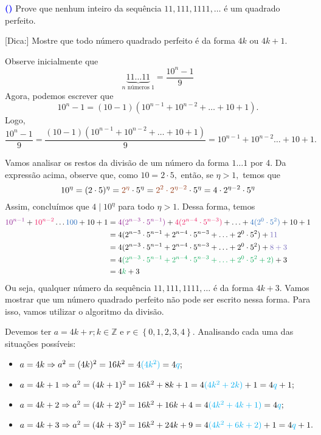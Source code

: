 \documentclass[12pt, a4paper]{article}
\newcommand{\Z}{\mathbb{Z}}
\newcounter{exercicio}[section]
\newenvironment{exercicio}[1][]{\refstepcounter{exercicio}\par\medskip
 \textcolor{blue}{\bf(\theexercicio)} \rmfamily}{\medskip }
\begin{document}
\begin{exercicio}
 Prove que nenhum inteiro da sequência $11, 111, 1111, \ldots$ é um quadrado perfeito.
 
 \textsf{[Dica:] Mostre que todo número quadrado perfeito é da forma $4k$ ou $4k+1.$}
\end{exercicio}
\begin{solution}
Observe inicialmente que 
\[
\underbrace{11\ldots 11}_{n \text{ números }1} = \dfrac{10^n-1}{9}
\]
Agora, podemos escrever que 
\[
10^n - 1 = (10 - 1)(10^{n-1} + 10^{n-2} + \ldots + 10 + 1).
\]
Logo, 
\[ \dfrac{10^n-1}{9} = \dfrac{(10 - 1)(10^{n-1} + 10^{n-2} + \ldots + 10 + 1)}{9} = 10^{n-1} + 10^{n-2}  \ldots + 10 + 1.\]

Vamos analisar os restos da divisão de um número da forma $1 \ldots 1$ por 4. Da expressão acima, observe que, como $10 = 2 \cdot 5,$ então, se $\eta > 1,$ temos que
\[
10^{\eta} = (2 \cdot 5)^{\eta} = \textcolor{RawSienna}{2^{\eta}} \cdot 5^{\eta} =\textcolor{RawSienna}{ 2^2 \cdot 2^{\eta - 2}} \cdot 5^{ \eta} = 4 \cdot  2^{\eta - 2} \cdot 5^{ \eta}
\]
Assim, concluímos que $4 \mid 10^{\eta}$ para todo $\eta > 1.$ Dessa forma, temos
\begin{align*}\textcolor{Plum}{10^{n-1}} + \textcolor{OrangeRed}{10^{n-2}}  \ldots \textcolor{NavyBlue}{100} + 10 + 1 &= \textcolor{Plum}{4(2^{n-3} \cdot 5^{n-1})} + \textcolor{OrangeRed}{4(2^{n-4} \cdot 5^{n-3})} + \ldots + \textcolor{NavyBlue}{4(2^0 \cdot 5^2)} + 10 + 1 \\&= 4(2^{n-3} \cdot 5^{n-1} + 2^{n-4} \cdot 5^{n-3} + \ldots + 2^0 \cdot 5^2) + \textcolor{Periwinkle}{11}
\\&= 4(2^{n-3} \cdot 5^{n-1} + 2^{n-4} \cdot 5^{n-3} + \ldots + 2^0 \cdot 5^2) + \textcolor{Periwinkle}{8+3}
\\&= 4\textcolor{Green}{(2^{n-3} \cdot 5^{n-1} + 2^{n-4} \cdot 5^{n-3} + \ldots + 2^0 \cdot 5^2 + 2)} + 3 \\&= 4 \textcolor{Green}{k} + 3
\end{align*}
Ou seja, qualquer número da sequência  $11, 111, 1111, \ldots$ é da forma $4k+3.$ Vamos mostrar que um número quadrado perfeito não pode ser escrito nessa forma. Para isso, vamos utilizar o algoritmo da divisão.

   Devemos ter $a=4k+r;k \in \Z$ e $r \in  \left\{0, 1, 2, 3, 4 \right\}$. Analisando cada uma das situações possíveis:

    \begin{itemize}
        \item $a=4k \Rightarrow a^2 = (4k)^2 = 16k^2 = 4\textcolor{Cyan}{(4k^2)} = 4\textcolor{Cyan}{q};$
    	\item $a=4k+1 \Rightarrow a^2 = (4k+1)^2 = 16k^2 + 8k + 1 = 4\textcolor{Cyan}{(4k^2 + 2k)} + 1 = 4\textcolor{Cyan}{q} + 1;$
         \item $a=4k+2 \Rightarrow a^2 = (4k+2)^2 = 16k^2 + 16k + 4 = 4\textcolor{Cyan}{(4k^2 + 4k + 1)} = 4\textcolor{Cyan}{q};$
    	\item $a=4k+3 \Rightarrow a^2 = (4k+3)^2 = 16k^2 + 24k + 9 = 4\textcolor{Cyan}{(4k^2 + 6k + 2)} + 1 = 4\textcolor{Cyan}{q} + 1.$ 
    \end{itemize}
    

\end{solution}
\end{document}
